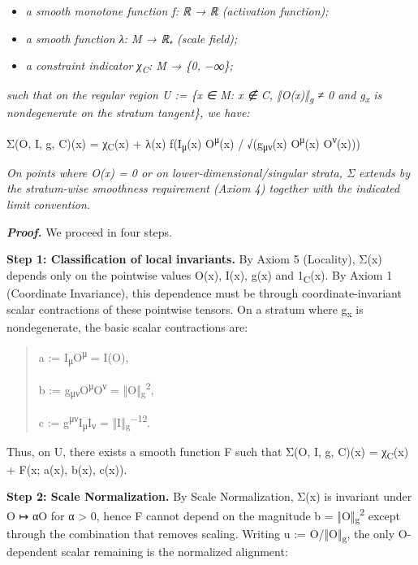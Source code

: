 \documentclass[12pt]{article}
\theoremstyle{plain}
\theoremstyle{definition}
\theoremstyle{remark}
\begin{document}
\begin{itemize}
\item
  \emph{a smooth monotone function f: ℝ → ℝ (activation function);}
\item
  \emph{a smooth function λ: M → ℝ₊ (scale field);}
\item
  \emph{a constraint indicator χ\textsubscript{C}: M → \{0, −∞\};}
\end{itemize}

\emph{such that on the regular region U := \{x ∈ M: x ∉ C,
‖O(x)‖\textsubscript{g} ≠ 0 and g\textsubscript{x} is nondegenerate on
the stratum tangent\}, we have:}

Σ(O, I, g, C)(x) = χ\textsubscript{C}(x) + λ(x) f(I\textsubscript{μ}(x)
O\textsuperscript{μ}(x) / √(g\textsubscript{μν}(x)
O\textsuperscript{μ}(x) O\textsuperscript{ν}(x)))

\emph{On points where O(x) = 0 or on lower-dimensional/singular strata,
Σ extends by the stratum-wise smoothness requirement (Axiom 4) together
with the indicated limit convention.}

\emph{\textbf{Proof.}} We proceed in four steps.

\textbf{Step 1: Classification of local invariants.} By Axiom 5
(Locality), Σ(x) depends only on the pointwise values O(x), I(x), g(x)
and 1\textsubscript{C}(x). By Axiom 1 (Coordinate Invariance), this
dependence must be through coordinate-invariant scalar contractions of
these pointwise tensors. On a stratum where g\textsubscript{x} is
nondegenerate, the basic scalar contractions are:

\begin{quote}
a := I\textsubscript{μ}O\textsuperscript{μ} = I(O),

b := g\textsubscript{μν}O\textsuperscript{μ}O\textsuperscript{ν} =
‖O‖\textsubscript{g}\textsuperscript{2},

c := g\textsuperscript{μν}I\textsubscript{μ}I\textsubscript{ν} =
‖I‖\textsubscript{g}\textsuperscript{−12}.
\end{quote}

Thus, on U, there exists a smooth function F such that Σ(O, I, g, C)(x)
= χ\textsubscript{C}(x) + F(x; a(x), b(x), c(x)).

\textbf{Step 2: Scale Normalization.} By Scale Normalization, Σ(x) is
invariant under O ↦ αO for α \textgreater{} 0, hence F cannot depend on
the magnitude b = ‖O‖\textsubscript{g}\textsuperscript{2} except through
the combination that removes scaling. Writing u :=
O/‖O‖\textsubscript{g}, the only O-dependent scalar remaining is the
normalized alignment:
\end{document}
